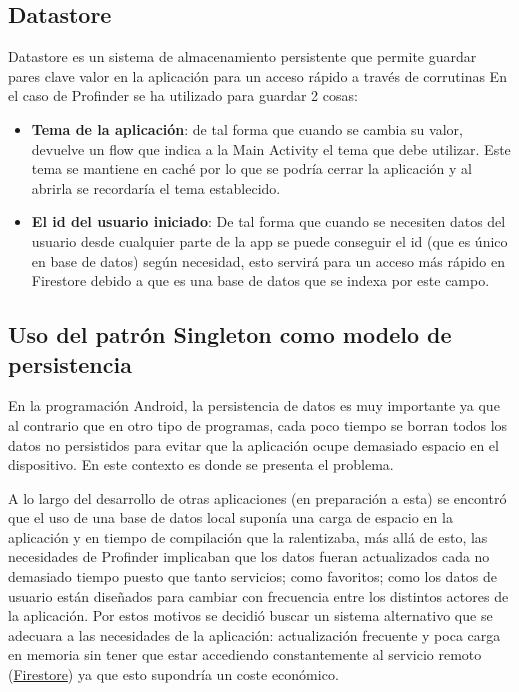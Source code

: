 \subsection{Datastore}
Datastore\hyperlink{cap:biblio}{} es un sistema de almacenamiento persistente que permite guardar pares clave valor en la aplicación para un acceso rápido a través de 
corrutinas\hyperlink{cap:biblio}{} En el caso de Profinder se ha utilizado para guardar 2 cosas:
\begin{itemize}
    \item \textbf{Tema de la aplicación}: de tal forma que cuando se cambia su valor, devuelve un flow\hyperlink{cap:biblio}{} que indica a la Main Activity el tema que debe utilizar. Este tema se mantiene en caché por lo que se podría cerrar la aplicación y al abrirla se recordaría el tema establecido.
    \item \textbf{El id del usuario iniciado}: De tal forma que cuando se necesiten datos del usuario desde cualquier parte de la app se puede conseguir el id (que es único en base de datos) según necesidad, esto servirá para un acceso más rápido en Firestore debido a que es una base de datos que se indexa por este campo.
\end{itemize}

\subsection{Uso del patrón Singleton como modelo de persistencia}
En la programación Android, la persistencia de datos es muy importante ya que al contrario que en otro tipo de programas, cada poco tiempo se borran todos los datos no persistidos para evitar que la aplicación ocupe demasiado espacio en el dispositivo. En este contexto es donde se presenta el problema.

A lo largo del desarrollo de otras aplicaciones (en preparación a esta) se encontró que el uso de una base de datos local suponía una carga de espacio en la aplicación y en tiempo de compilación que la ralentizaba, más allá de esto, las necesidades de Profinder implicaban que los datos fueran actualizados cada no demasiado tiempo puesto que tanto servicios; como favoritos; como los datos de usuario están diseñados para cambiar con frecuencia entre los distintos actores de la aplicación. Por estos motivos se decidió buscar un sistema alternativo que se adecuara a las necesidades de la aplicación: actualización frecuente y poca carga en memoria sin tener que estar accediendo constantemente al servicio remoto (\hyperlink{subsec:firestore}{Firestore}) ya que esto supondría un coste económico.

